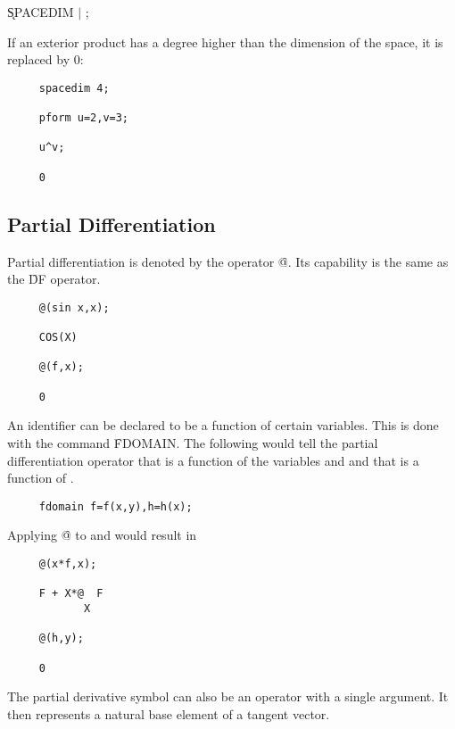 \hspace*{2em} \k{SPACEDIM}  $\mid$ ;

If an exterior product has a degree higher than the dimension of the
space, it is replaced by 0:

\begin{verbatim}
     spacedim 4;

     pform u=2,v=3;

     u^v;

     0
\end{verbatim}


\subsection{Partial Differentiation}

Partial differentiation is denoted by the operator \f{@}\label{at}.  Its
capability is the same as the {\REDUCE} \f{DF} operator.
 
\hypertarget{operator:@}{}

\example{}

\begin{verbatim}
     @(sin x,x);

     COS(X)

     @(f,x);

     0
\end{verbatim}

An identifier can be declared to be a function of certain variables.
\hypertarget{command:FDOMAIN}{}
This is done with the command \f{FDOMAIN}\label{FDOMAIN}.  The
following would tell the partial differentiation operator that 
is a function of the variables  and  and that  is
a function of .
\begin{verbatim}
     fdomain f=f(x,y),h=h(x);
\end{verbatim}
Applying \f{@} to  and  would result in
\begin{verbatim}
     @(x*f,x);

     F + X*@  F
            X

     @(h,y);

     0
\end{verbatim}

The partial derivative symbol can also be an operator with a single
argument.  It then represents a natural base element of a tangent
vector\label{at1}.

